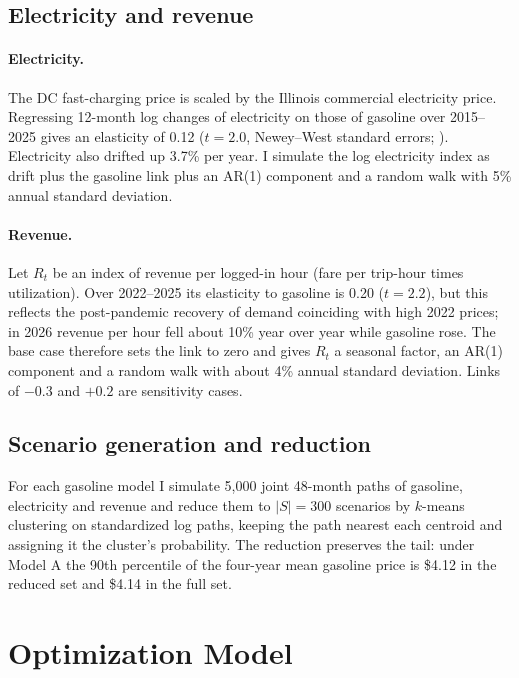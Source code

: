 \documentclass[11pt]{article}
\begin{document}
\subsection{Electricity and revenue}

\paragraph{Electricity.} The DC fast-charging price is scaled by the Illinois commercial electricity price. Regressing 12-month log changes of electricity on those of gasoline over 2015--2025 gives an elasticity of 0.12 ($t = 2.0$, Newey--West standard errors; \citealp{newey1987}). Electricity also drifted up 3.7\% per year. I simulate the log electricity index as drift plus the gasoline link plus an AR(1) component and a random walk with 5\% annual standard deviation.

\paragraph{Revenue.} Let $R_t$ be an index of revenue per logged-in hour (fare per trip-hour times utilization). Over 2022--2025 its elasticity to gasoline is 0.20 ($t = 2.2$), but this reflects the post-pandemic recovery of demand coinciding with high 2022 prices; in 2026 revenue per hour fell about 10\% year over year while gasoline rose. The base case therefore sets the link to zero and gives $R_t$ a seasonal factor, an AR(1) component and a random walk with about 4\% annual standard deviation. Links of $-0.3$ and $+0.2$ are sensitivity cases.

\subsection{Scenario generation and reduction}

For each gasoline model I simulate 5{,}000 joint 48-month paths of gasoline, electricity and revenue and reduce them to $|S| = 300$ scenarios by $k$-means clustering on standardized log paths, keeping the path nearest each centroid and assigning it the cluster's probability. The reduction preserves the tail: under Model A the 90th percentile of the four-year mean gasoline price is \$4.12 in the reduced set and \$4.14 in the full set.

\section{Optimization Model}\label{sec:model}
\end{document}

